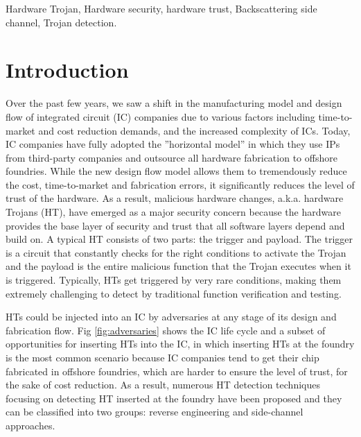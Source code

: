 \documentclass[journal]{IEEEtran}
\begin{document}
\begin{IEEEkeywords}
Hardware Trojan, Hardware security, hardware trust,                                                                                                                                                        Backscattering side channel, Trojan detection.
\end{IEEEkeywords}

\section{Introduction}
Over the past few years, we saw a shift in the manufacturing model and design flow of integrated circuit (IC) companies due to various factors including time-to-market and cost reduction demands, and the increased complexity of ICs. Today, IC companies have fully adopted the ”horizontal model” in which they use IPs from third-party companies and outsource all hardware fabrication to offshore foundries. While the new design flow model allows them to tremendously reduce the
cost, time-to-market and fabrication errors, it significantly reduces the level of trust of the hardware. As a result, malicious hardware changes, a.k.a. hardware Trojans (HT), have emerged as a major security concern because the hardware provides the base layer of security and trust that all software layers depend and build on. A typical HT consists of two parts: the trigger and payload. The trigger is a circuit that constantly checks for the right conditions to activate the Trojan and the payload is the entire malicious function that the Trojan executes when it is triggered. Typically, HTs get triggered by very rare conditions, making them extremely challenging to detect by traditional function verification and testing.

HTs could be injected into an IC by adversaries at any stage of its design and fabrication flow. Fig \ref{fig:adversaries} shows the IC life cycle and a subset of opportunities for inserting HTs into the IC, in which inserting HTs at the foundry is the most common scenario because IC companies tend to get their chip fabricated in offshore foundries, which are harder to ensure  the level of trust, for the sake of cost reduction. As a result,  numerous HT detection techniques focusing on detecting HT inserted at the foundry have been proposed and they can be classified into two groups: reverse engineering and side-channel approaches. 
\end{document}
